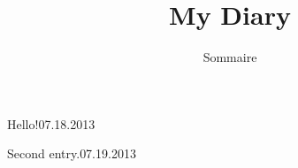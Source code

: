 \documentclass[a4paper]{book}
\title{\Huge My Diary}
\author{Sommaire}
\date{}
\begin{document}
\maketitle
\begin{diary}{Hello!}{07.18.2013}
 \lipsum[1]
\end{diary}


\begin{diary}{Second entry.}{07.19.2013}
 \lipsum[2]
\end{diary}
\end{document}
